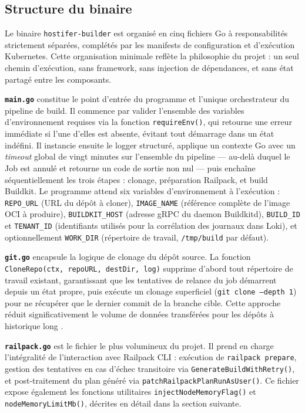 \subsection{Structure du binaire}

Le binaire \texttt{hostifer-builder} est organisé en cinq fichiers Go à responsabilités strictement séparées, complétés par les manifests de configuration et d'exécution Kubernetes. Cette organisation minimale reflète la philosophie du projet : un seul chemin d'exécution, sans framework, sans injection de dépendances, et sans état partagé entre les composants.

\textbf{\texttt{main.go}} constitue le point d'entrée du programme et l'unique orchestrateur du pipeline de build. Il commence par valider l'ensemble des variables d'environnement requises via la fonction \texttt{requireEnv()}, qui retourne une erreur immédiate si l'une d'elles est absente, évitant tout démarrage dans un état indéfini. Il instancie ensuite le logger structuré, applique un contexte Go avec un \textit{timeout} global de vingt minutes sur l'ensemble du pipeline — au-delà duquel le Job est annulé et retourne un code de sortie non nul — puis enchaîne séquentiellement les trois étapes : clonage, préparation Railpack, et build Buildkit. Le programme attend six variables d'environnement à l'exécution : \texttt{REPO\_URL} (URL du dépôt à cloner), \texttt{IMAGE\_NAME} (référence complète de l'image OCI à produire), \texttt{BUILDKIT\_HOST} (adresse gRPC du daemon Buildkitd), \texttt{BUILD\_ID} et \texttt{TENANT\_ID} (identifiants utilisés pour la corrélation des journaux dans Loki), et optionnellement \texttt{WORK\_DIR} (répertoire de travail, \texttt{/tmp/build} par défaut).

\textbf{\texttt{git.go}} encapsule la logique de clonage du dépôt source. La fonction \texttt{CloneRepo(ctx, repoURL, destDir, log)} supprime d'abord tout répertoire de travail existant, garantissant que les tentatives de relance du job démarrent depuis un état propre, puis exécute un clonage superficiel (\texttt{git clone --depth 1}) pour ne récupérer que le dernier commit de la branche cible. Cette approche réduit significativement le volume de données transférées pour les dépôts à historique long \cite{git-shallow}.

\textbf{\texttt{railpack.go}} est le fichier le plus volumineux du projet. Il prend en charge l'intégralité de l'interaction avec Railpack CLI : exécution de \texttt{railpack prepare}, gestion des tentatives en cas d'échec transitoire via \texttt{GenerateBuildWithRetry()}, et post-traitement du plan généré via \texttt{patchRailpackPlanRunAsUser()}. Ce fichier expose également les fonctions utilitaires \texttt{injectNodeMemoryFlag()} et \texttt{nodeMemoryLimitMb()}, décrites en détail dans la section suivante.

